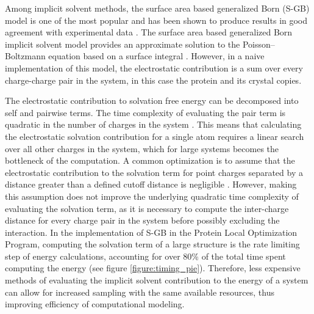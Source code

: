 Among implicit solvent methods, the surface area based generalized Born (S-GB) model is one of the most popular and has been shown to produce results in good agreement with experimental data \cite{zhang2001solvent,gallicchio2002sgb}.
The surface area based generalized Born implicit solvent model provides an approximate solution to the Poisson--Boltzmann equation based on a surface integral \cite{ghosh1998generalized}.
However, in a naive implementation of this model, the electrostatic contribution is a sum over every charge-charge pair in the system, in this case the protein and its crystal copies.

The electrostatic contribution to solvation free energy can be decomposed into self and pairwise terms.
The time complexity of evaluating the pair term is quadratic in the number of charges in the system \cite{ghosh1998generalized}.
This means that calculating the electrostatic solvation contribution for a single atom requires a linear search over all other charges in the system, which for large systems becomes the bottleneck of the computation.
A common optimization is to assume that the electrostatic contribution to the solvation term for point charges separated by a distance greater than a defined cutoff distance is negligible \cite{gallicchio2004agbnp}. 
However, making this assumption does not improve the underlying quadratic time complexity of evaluating the solvation term, as it is necessary to compute the inter-charge distance for every charge pair in the system before possibly excluding the interaction.
In the implementation of S-GB in the Protein Local Optimization Program, computing the solvation term of a large structure is the rate limiting step of energy calculations, accounting for over 80\% of the total time spent computing the energy (see figure \ref{figure:timing_pie}).
Therefore, less expensive methods of evaluating the implicit solvent contribution to the energy of a system can allow for increased sampling with the same available resources, thus improving efficiency of computational modeling. 

